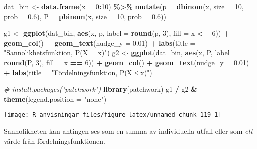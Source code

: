 \documentclass[
]{book}
\newenvironment{Shaded}{\begin{snugshade}}{\end{snugshade}}
\newcommand{\AttributeTok}[1]{\textcolor[rgb]{0.13,0.29,0.53}{#1}}
\newcommand{\CommentTok}[1]{\textcolor[rgb]{0.56,0.35,0.01}{\textit{#1}}}
\newcommand{\DecValTok}[1]{\textcolor[rgb]{0.00,0.00,0.81}{#1}}
\newcommand{\FloatTok}[1]{\textcolor[rgb]{0.00,0.00,0.81}{#1}}
\newcommand{\FunctionTok}[1]{\textcolor[rgb]{0.13,0.29,0.53}{\textbf{#1}}}
\newcommand{\NormalTok}[1]{#1}
\newcommand{\OtherTok}[1]{\textcolor[rgb]{0.56,0.35,0.01}{#1}}
\newcommand{\SpecialCharTok}[1]{\textcolor[rgb]{0.81,0.36,0.00}{\textbf{#1}}}
\newcommand{\StringTok}[1]{\textcolor[rgb]{0.31,0.60,0.02}{#1}}
\theoremstyle{definition}
\theoremstyle{definition}
\theoremstyle{definition}
\theoremstyle{definition}
\theoremstyle{remark}
\begin{document}
\begin{Shaded}
\begin{Highlighting}[]
\NormalTok{dat\_bin }\OtherTok{\textless{}{-}} \FunctionTok{data.frame}\NormalTok{(}\AttributeTok{x =} \DecValTok{0}\SpecialCharTok{:}\DecValTok{10}\NormalTok{) }\SpecialCharTok{\%\textgreater{}\%} 
  \FunctionTok{mutate}\NormalTok{(}\AttributeTok{p =} \FunctionTok{dbinom}\NormalTok{(x, }\AttributeTok{size =} \DecValTok{10}\NormalTok{, }\AttributeTok{prob =} \FloatTok{0.6}\NormalTok{),}
         \AttributeTok{P =} \FunctionTok{pbinom}\NormalTok{(x, }\AttributeTok{size =} \DecValTok{10}\NormalTok{, }\AttributeTok{prob =} \FloatTok{0.6}\NormalTok{))}

\NormalTok{g1 }\OtherTok{\textless{}{-}} \FunctionTok{ggplot}\NormalTok{(dat\_bin, }\FunctionTok{aes}\NormalTok{(x, p, }\AttributeTok{label =} \FunctionTok{round}\NormalTok{(p, }\DecValTok{3}\NormalTok{), }\AttributeTok{fill =}\NormalTok{ x }\SpecialCharTok{\textless{}=} \DecValTok{6}\NormalTok{)) }\SpecialCharTok{+} 
  \FunctionTok{geom\_col}\NormalTok{() }\SpecialCharTok{+} 
  \FunctionTok{geom\_text}\NormalTok{(}\AttributeTok{nudge\_y =} \FloatTok{0.01}\NormalTok{) }\SpecialCharTok{+}
  \FunctionTok{labs}\NormalTok{(}\AttributeTok{title =} \StringTok{"Sannolikhetsfunktion, P(X = x)"}\NormalTok{)}
\NormalTok{g2 }\OtherTok{\textless{}{-}} \FunctionTok{ggplot}\NormalTok{(dat\_bin, }\FunctionTok{aes}\NormalTok{(x, P, }\AttributeTok{label =} \FunctionTok{round}\NormalTok{(P, }\DecValTok{3}\NormalTok{), }\AttributeTok{fill =}\NormalTok{ x }\SpecialCharTok{==} \DecValTok{6}\NormalTok{)) }\SpecialCharTok{+} 
  \FunctionTok{geom\_col}\NormalTok{() }\SpecialCharTok{+} 
  \FunctionTok{geom\_text}\NormalTok{(}\AttributeTok{nudge\_y =} \FloatTok{0.01}\NormalTok{) }\SpecialCharTok{+}
  \FunctionTok{labs}\NormalTok{(}\AttributeTok{title =} \StringTok{"Fördelningsfunktion, P(X ≤ x)"}\NormalTok{)}

\CommentTok{\# install.packages("patchwork")}
\FunctionTok{library}\NormalTok{(patchwork)}
\NormalTok{g1 }\SpecialCharTok{/}\NormalTok{ g2 }\SpecialCharTok{\&} \FunctionTok{theme}\NormalTok{(}\AttributeTok{legend.position =} \StringTok{"none"}\NormalTok{)}
\end{Highlighting}
\end{Shaded}

\begin{center}\texttt{[image: R-anvisningar\_files/figure-latex/unnamed-chunk-119-1]} \end{center}

Sannolikheten kan antingen ses som en summa av individuella utfall eller som \emph{ett} värde från fördelningsfunktionen.
\end{document}

